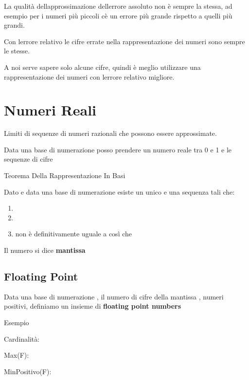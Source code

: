 \documentclass[
]{article}
\providecommand{\tightlist}{%
  \setlength{\itemsep}{0pt}\setlength{\parskip}{0pt}}
\begin{document}
La qualità dell\textquotesingle approssimazione
dell\textquotesingle errore assoluto non è sempre la stessa, ad esempio
per i numeri più piccoli c\textquotesingle è un errore più grande
rispetto a quelli più grandi.

Con l\textquotesingle errore relativo le cifre errate nella
rappresentazione dei numeri sono sempre le stesse.

A noi serve sapere solo alcune cifre, quindi è meglio utilizzare una
rappresentazione dei numeri con l\textquotesingle errore relativo
migliore.

\hypertarget{numeri-reali}{%
\section{Numeri Reali}\label{numeri-reali}}

Limiti di sequenze di numeri razionali che possono essere approssimate.

Data una base di numerazione {} posso prendere un numero reale tra 0 e 1
e le sequenze di cifre

{}

Teorema Della Rappresentazione In Basi

Dato {} e data una base di numerazione {} esiste un unico {} e una
sequenza {} tali che:

\begin{enumerate}
\tightlist
\item
  {}
\item
  {}
\item
  {} non è definitivamente uguale a {} così che {}
\end{enumerate}

Il numero {} si dice \textbf{mantissa}

\hypertarget{floating-point}{%
\subsection{Floating Point}\label{floating-point}}

Data una base di numerazione {}, il numero {} di cifre della mantissa
{}, {} numeri positivi, definiamo un insieme di \textbf{floating point
numbers}

{}{}

Esempio

{}

Cardinalità: {}

Max(F): {}

MinPositivo(F): {}
\end{document}
